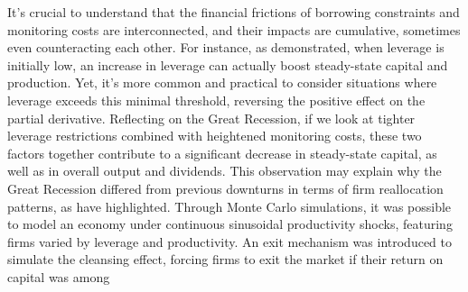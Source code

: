 \documentclass[12pt]{report}
\begin{document}
It's crucial to understand that the financial frictions of borrowing constraints and monitoring costs are
interconnected, and their impacts are cumulative, sometimes even counteracting each other. For instance, as
demonstrated, when leverage is initially low, an increase in leverage can actually boost steady-state capital and
production. Yet, it's more common and practical to consider situations where leverage exceeds this minimal threshold,
reversing the positive effect on the partial derivative. Reflecting on the Great Recession, if we look at tighter
leverage restrictions combined with heightened monitoring costs, these two factors together contribute to a significant
decrease in steady-state capital, as well as in overall output and dividends. 
This observation may explain why the Great Recession differed from previous downturns in terms of firm reallocation
patterns, as \cite{FosHal16} have highlighted. Through Monte Carlo simulations, it was possible to model an economy
under continuous sinusoidal productivity shocks, featuring firms varied by leverage and productivity. An exit mechanism
was introduced to simulate the cleansing effect, forcing firms to exit the market if their return on capital was among
\end{document}
